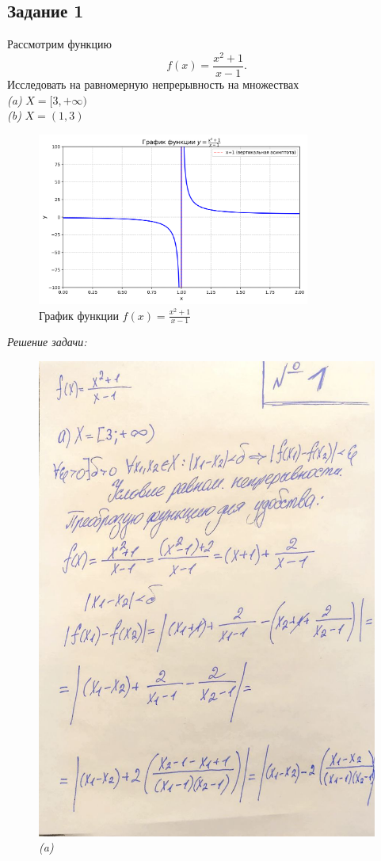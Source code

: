 \documentclass[a4paper,12pt]{article}
\begin{document}
\subsection{Задание 1}

Рассмотрим функцию
\[
f(x) = \frac{x^2 + 1}{x - 1}.
\]
Исследовать на равномерную непрерывность на множествах\\
\emph{(a)} \( X = [3, +\infty) \) \\
\emph{(b)} \( X = (1, 3) \)\\

\begin{figure}[h] %
    \centering %
    \includegraphics[width=0.8\textwidth]{img/task1_graph.png} %
    \caption{График функции \( f(x) = \frac{x^2 + 1}{x - 1} \)}
    \label{fig:graph}
\end{figure}
\emph{Решение задачи:}

\begin{figure}[H]
    \centering
    \includegraphics[width=0.8\linewidth]{img/1_1.jpg}
    \caption{\emph{(a)}}
    \label{fig:part1}
\end{figure}
\end{document}
